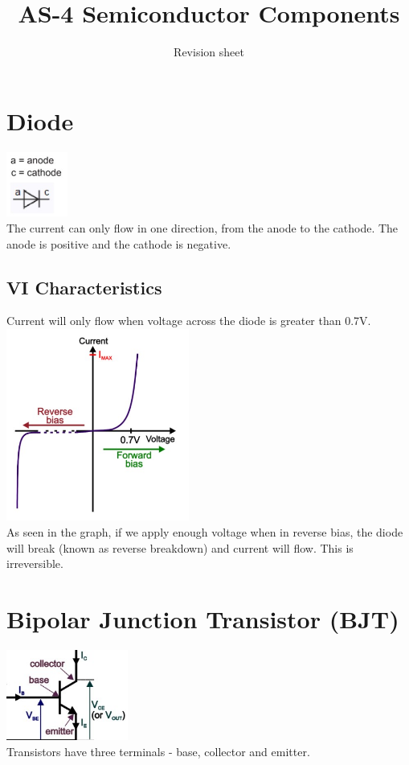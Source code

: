 \documentclass[a4paper,11pt, twocolumn]{article}
\title{AS-4 Semiconductor Components}
\author{Revision sheet}
\date{}
\begin{document}
\maketitle
\thispagestyle{fancy}


\section{Diode}
\includegraphics[width=0.15\textwidth]{diode.jpg}\\
The current can only flow in one direction, from the anode to the cathode. The anode is positive and the cathode is negative. 
\subsection{VI Characteristics}
Current will only flow when voltage across the diode is greater than 0.7V. \\
\includegraphics[width=0.45\textwidth]{diode vi characteristics.jpg}\\
As seen in the graph, if we apply enough voltage when in reverse bias, the diode will break (known as reverse breakdown) and current will flow. This is irreversible. 

\section{Bipolar Junction Transistor (BJT)}
\includegraphics[width=0.3\textwidth]{bjt.jpg}\\
Transistors have three terminals - base, collector and emitter.
\end{document}
